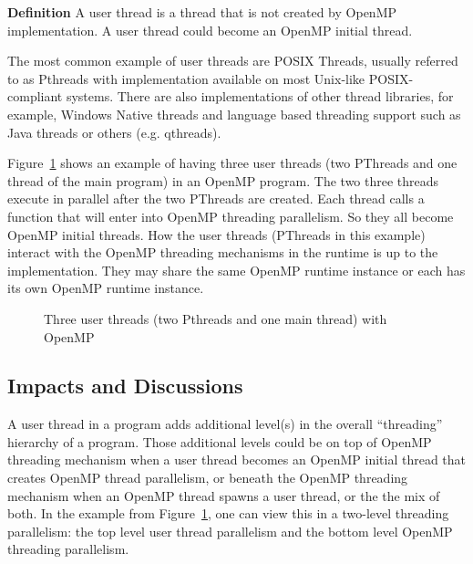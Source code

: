 \textbf{Definition}
A user thread is a thread that is not created by OpenMP implementation. A user thread 
could become an OpenMP initial thread. 

The most common example of user threads are POSIX Threads, 
usually referred to as Pthreads with implementation available on most Unix-like 
POSIX-compliant systems. There are also implementations of other thread libraries, 
for example, Windows Native threads and language based threading support such as 
Java threads or others (e.g. qthreads). 

Figure~\ref{fig:pthread-omp} shows an example of having three user 
threads (two PThreads and one thread of the main program) in an OpenMP program. 
The two three threads execute in parallel after the two PThreads are created. 
Each thread calls a function that will enter into
OpenMP threading parallelism. So they all become OpenMP initial threads. How the 
user threads (PThreads in this example) interact with the OpenMP threading mechanisms
in the runtime is up to the implementation. They may share the same OpenMP runtime
instance or each has its own OpenMP runtime instance. 

\begin{figure}[t]
\centering
\caption{Three user threads (two Pthreads and one main thread) with OpenMP}
  \label{fig:pthread-omp}
\end{figure}

\subsection{Impacts and Discussions}
A user thread in a program adds additional level(s) in the overall ``threading''
hierarchy of a program. Those additional levels could be on top of OpenMP threading 
mechanism when a user thread becomes an OpenMP initial thread that creates OpenMP thread
parallelism, or beneath the OpenMP threading mechanism when an OpenMP thread spawns 
a user thread, or the the mix of both. In the example from Figure~\ref{fig:pthread-omp}, 
one can view this in a two-level threading parallelism: the top level user thread 
parallelism and the bottom level OpenMP threading parallelism.

